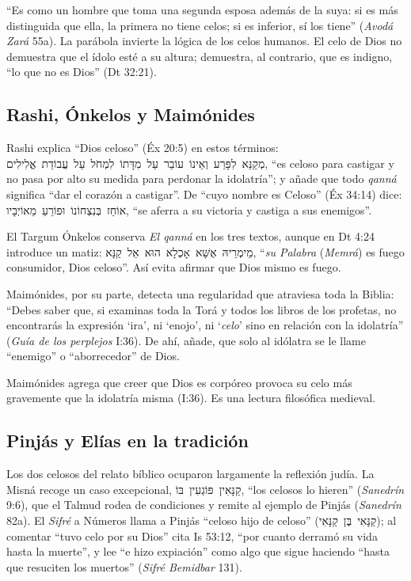 \documentclass[11pt,letterpaper]{article}
\newcommand{\heb}[1]{\mbox{\foreignlanguage{hebrew}{#1}}}
\begin{document}
``Es como un hombre que toma una segunda esposa además de la suya: si es más distinguida que ella, la primera no tiene celos; si es inferior, sí los tiene'' (\emph{Avodá Zará} 55a). La parábola invierte la lógica de los celos humanos. El celo de Dios no demuestra que el ídolo esté a su altura; demuestra, al contrario, que es indigno, ``lo que no es Dios'' (Dt 32:21).

\subsection{Rashi, Ónkelos y Maimónides}
Rashi explica ``Dios celoso'' (Éx 20:5) en estos términos: \heb{מְקַנֵּא לִפָּרַע וְאֵינוֹ עוֹבֵר עַל מִדָּתוֹ לִמְחֹל עַל עֲבוֹדַת אֱלִילִים}, ``es celoso para castigar y no pasa por alto su medida para perdonar la idolatría''; y añade que todo \emph{qanná} significa ``dar el corazón a castigar''. De ``cuyo nombre es Celoso'' (Éx 34:14) dice: \heb{אוֹחֵז בְּנִצְחוֹנוֹ וּפוֹרֵעַ מֵאוֹיְבָיו}, ``se aferra a su victoria y castiga a sus enemigos''.

El Targum Ónkelos conserva \emph{El qanná} en los tres textos, aunque en Dt 4:24 introduce un matiz: \heb{מֵימְרֵיהּ אֶשָּׁא אָכְלָא הוּא אֵל קַנָּא}, ``\emph{su Palabra} (\emph{Memrá}) es fuego consumidor, Dios celoso''. Así evita afirmar que Dios mismo es fuego.

Maimónides, por su parte, detecta una regularidad que atraviesa toda la Biblia: ``Debes saber que, si examinas toda la Torá y todos los libros de los profetas, no encontrarás la expresión `ira', ni `enojo', ni `\emph{celo}' sino en relación con la idolatría'' (\emph{Guía de los perplejos} I:36). De ahí, añade, que solo al idólatra se le llame ``enemigo'' o ``aborrecedor'' de Dios.

\begin{nota}[Precisión]
Maimónides agrega que creer que Dios es corpóreo provoca su celo más gravemente que la idolatría misma (I:36). Es una lectura filosófica medieval.
\end{nota}

\subsection{Pinjás y Elías en la tradición}
Los dos celosos del relato bíblico ocuparon largamente la reflexión judía. La Misná recoge un caso excepcional, \heb{קַנָּאִין פּוֹגְעִין בּוֹ}, ``los celosos lo hieren'' (\emph{Sanedrín} 9:6), que el Talmud rodea de condiciones y remite al ejemplo de Pinjás (\emph{Sanedrín} 82a). El \emph{Sifré} a Números llama a Pinjás ``celoso hijo de celoso'' (\heb{קַנָּאִי בֶּן קַנָּאִי}); al comentar ``tuvo celo por su Dios'' cita Is 53:12, ``por cuanto derramó su vida hasta la muerte'', y lee ``e hizo expiación'' como algo que sigue haciendo ``hasta que resuciten los muertos'' (\emph{Sifré Bemidbar} 131).
\end{document}

